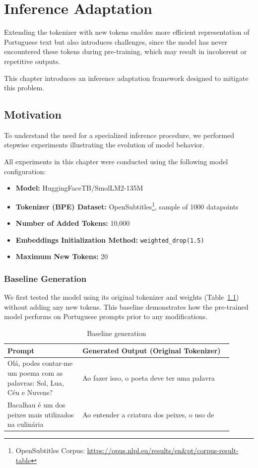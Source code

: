 \chapter{Inference Adaptation}
\label{chap:inference_adaptation}

Extending the tokenizer with new tokens enables more efficient representation of Portuguese text but also introduces challenges, since the model has never encountered these tokens during pre-training, which may result in incoherent or repetitive outputs.

This chapter introduces an inference adaptation framework designed to mitigate this problem.

\section{Motivation}

To understand the need for a specialized inference procedure, we performed stepwise experiments illustrating the evolution of model behavior.

All experiments in this chapter were conducted using the following model configuration:
\begin{itemize}
    \item \textbf{Model:} HuggingFaceTB/SmolLM2-135M
    \item \textbf{Tokenizer (BPE) Dataset:} OpenSubtitles\footnote{OpenSubtitles Corpus: \url{https://opus.nlpl.eu/results/en&pt/corpus-result-table}}, sample of 1000 datapoints
    \item \textbf{Number of Added Tokens:} 10,000
    \item \textbf{Embeddings Initialization Method:} \texttt{weighted\_drop(1.5)}
    \item \textbf{Maximum New Tokens:} 20
\end{itemize}


\subsection{Baseline Generation}
We first tested the model using its original tokenizer and weights (Table~\ref{tab:default-baseline}) without adding any new tokens. This baseline demonstrates how the pre-trained model performs on Portuguese prompts prior to any modifications.

\begin{table}[H]
    \centering
    \begin{tabular}{|p{0.3\linewidth}|p{0.6\linewidth}|}
        \hline
        \textbf{Prompt} & \textbf{Generated Output (Original Tokenizer)} \\
        \hline
        Olá, podes contar-me um poema com as palavras: Sol, Lua, Céu e Nuvens? & Ao fazer isso, o poeta deve ter uma palavra \\
        \hline
        Bacalhau é um dos peixes mais utilizados na culinária & Ao entender a criatura dos peixes, o uso de \\
        \hline
    \end{tabular}
    \caption{Baseline generation}
    \label{tab:default-baseline}
\end{table}

